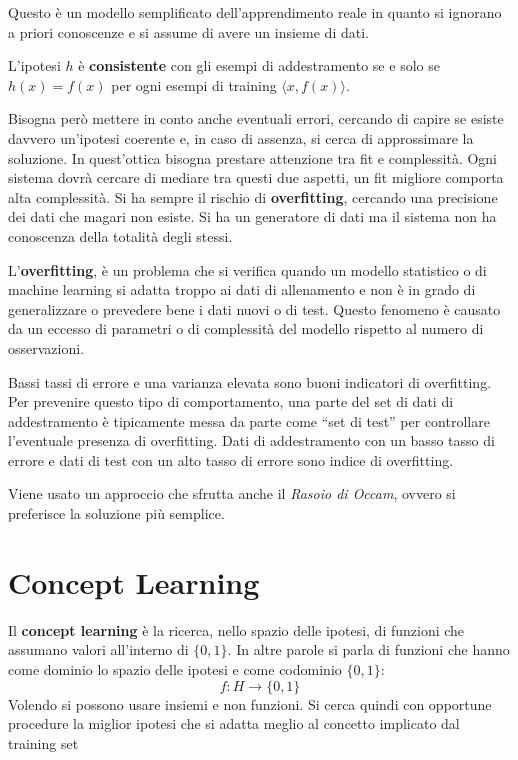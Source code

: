 Questo è un modello semplificato dell'apprendimento reale in quanto si ignorano a priori conoscenze e si assume di avere un insieme di dati. 

L'ipotesi $h$ è \textbf{consistente} con gli esempi di addestramento se e solo se $h(x) = f(x)$ per ogni esempi di training $\langle x, f(x)\rangle$.

Bisogna però mettere in conto anche eventuali errori, cercando di capire se esiste davvero un'ipotesi coerente e, in caso di assenza, si cerca di approssimare la soluzione. In quest'ottica bisogna prestare attenzione tra fit e complessità. Ogni sistema dovrà cercare di mediare tra questi due aspetti, un fit migliore comporta alta complessità. Si ha sempre il rischio di \textbf{overfitting}, cercando una precisione dei dati che magari non esiste. Si ha un generatore di dati ma il sistema non ha conoscenza della totalità degli stessi.
\begin{definizione}
    L'\textbf{overfitting}, è un problema che si verifica quando un modello statistico o di machine learning si adatta troppo ai dati di allenamento e non è in grado di generalizzare o prevedere bene i dati nuovi o di test. Questo fenomeno è causato da un eccesso di parametri o di complessità del modello rispetto al numero di osservazioni.
    
    Bassi tassi di errore e una varianza elevata sono buoni indicatori di overfitting. Per prevenire questo tipo di comportamento, una parte del set di dati di addestramento è tipicamente messa da parte come “set di test” per controllare l'eventuale presenza di overfitting. Dati di addestramento con un basso tasso di errore e dati di test con un alto tasso di errore sono indice di overfitting.
\end{definizione}

Viene usato un approccio che sfrutta anche il \textit{Rasoio di Occam}, ovvero si preferisce la soluzione più semplice.
\section{Concept Learning}
\begin{definizione}
    Il \textbf{concept learning} è la ricerca, nello spazio delle ipotesi, di funzioni che assumano valori all'interno di $\{0, 1\}$. In altre parole si parla di funzioni che hanno come dominio lo spazio delle ipotesi e come codominio $\{0, 1\}$:
    \begin{equation}
        f: H \to \{0, 1\}
    \end{equation}
    Volendo si possono usare insiemi e non funzioni. Si cerca quindi con opportune procedure la miglior ipotesi che si adatta meglio al concetto implicato dal training set
\end{definizione}

